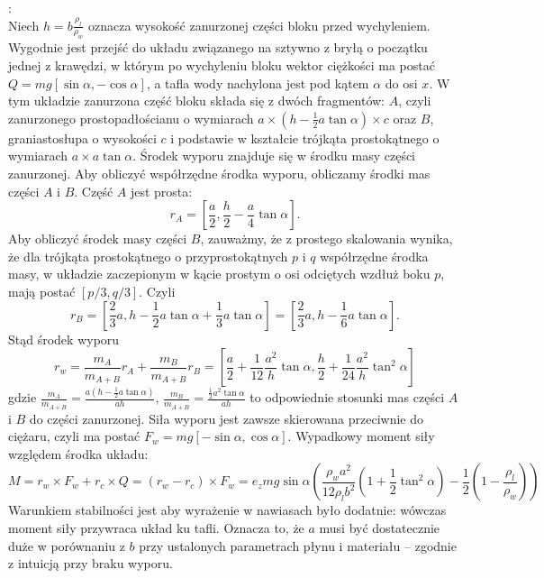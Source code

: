 \documentclass[11pt,a4paper]{article}
\begin{document}
\vspace{2mm}{\bf Rozwiązanie}:\\

Niech $h=b\frac{\rho_l}{\rho_w}$ oznacza wysokość zanurzonej części bloku przed wychyleniem. Wygodnie jest przejść do układu związanego na sztywno z bryłą o początku jednej z krawędzi, w którym po wychyleniu bloku wektor ciężkości ma postać $Q=mg[\sin \alpha,-\cos\alpha]$, a tafla wody nachylona jest pod kątem $\alpha$ do osi $x$. W tym układzie zanurzona część bloku składa się z dwóch fragmentów: $A$, czyli zanurzonego prostopadłościanu o wymiarach $a\times (h-\frac{1}{2}a\tan \alpha)\times c$ oraz $B$, graniastosłupa o wysokości $c$ i  podstawie w kształcie trójkąta prostokątnego o wymiarach $a\times a \tan \alpha$. Środek wyporu znajduje się w środku masy części zanurzonej. Aby obliczyć współrzędne środka wyporu, obliczamy środki mas części $A$ i $B$. Część $A$ jest prosta: 
\begin{equation}
r_A=[\frac{a}{2}, \frac{h}{2}-\frac{a}{4}\tan \alpha].
\end{equation}
Aby obliczyć środek masy części $B$, zauważmy, że z prostego skalowania wynika, że dla trójkąta prostokątnego o przyprostokątnych $p$ i $q$ współrzędne środka masy, w układzie zaczepionym w kącie prostym o osi odciętych wzdłuż boku $p$, mają postać $[p/3,q/3]$. Czyli 
\begin{equation}
r_B=[\frac{2}{3}a,h-\frac{1}{2}a\tan \alpha+\frac{1}{3}a \tan \alpha]=[\frac{2}{3}a,h-\frac{1}{6}a\tan\alpha].
\end{equation}
Stąd środek wyporu
\begin{equation}
r_w=\frac{m_A}{m_{A+B}}r_A+\frac{m_B}{m_{A+B}}r_B=[\frac{a}{2}+\frac{1}{12}\frac{a^2}{h}\tan \alpha, \frac{h}{2}+\frac{1}{24}\frac{a^2}{h}\tan^2\alpha]
\end{equation}
gdzie $\frac{m_A}{m_{A+B}}=\frac{a(h-\frac{1}{2}a\tan \alpha)}{ah}$, $\frac{m_B}{m_{A+B}}=\frac{\frac{1}{2}a^2\tan\alpha}{ah}$ to odpowiednie stosunki mas części $A$ i $B$ do części zanurzonej. 
Siła wyporu jest zawsze skierowana przeciwnie do ciężaru, czyli ma postać $F_w=mg[-\sin\alpha, \cos\alpha]$. Wypadkowy moment siły względem środka układu:
\begin{equation}
M=r_w\times F_w+r_c\times Q=(r_w-r_c)\times F_w=e_z mg \sin\alpha \left(\frac{\rho_wa^2}{12\rho_lb^2}(1+\frac{1}{2}\tan^2\alpha)-\frac{1}{2}(1-\frac{\rho_l}{\rho_w})\right)
\end{equation}
Warunkiem stabilności jest aby wyrażenie w nawiasach było dodatnie: wówczas moment siły przywraca układ ku tafli. Oznacza to, że $a$ musi być dostatecznie duże w porównaniu z $b$ przy ustalonych parametrach płynu i materiału -- zgodnie z intuicją przy braku wyporu.  
\end{document}
